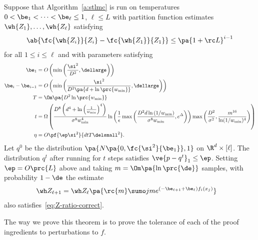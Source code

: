 \begin{lem}\label{lem:a1-correct-perturb}
Suppose that Algorithm~\ref{a:stlmc} is run on temperatures $0<\be_1<\cdots< \be_\ell\le 1$, $\ell\le L$ with partition function estimates $\wh{Z_1},\ldots, \wh{Z_\ell}$ satisfying
\begin{align}\label{eq:Z-ratio-correct}
\ab{\fc{\wh{Z_i}}{Z_i} - \fc{\wh{Z_1}}{Z_1}}\le \pa{1+\rc L}^{i-1}
\end{align} 
for all $1\le i\le \ell$
and with parameters satisfying
\begin{align}
\label{eq:beta1-perturb}
\be_1 &= O\left(\min\left(\frac{\si^2}{D^2}, \dellarge \right)\right)\\
\label{eq:beta-diff-perturb}
\be_i-\be_{i-1} &= 
O \left(\min\left( \frac{\si^2}{D^2\pa{d+\ln \prc{w_{\min}}}} , \dellarge \right)\right)\\
T&=\Om\pa{D^2\ln \prc{w_{\min}}}\\
t&=\Omega \left(\frac{D^8 \left(d^4 + \ln\left(\frac{1}{w_{\min}}\right)^4 \right)}{\sigma^8 w^4_{\min}} \ln\left(\frac{1}{\epsilon} \max\left(\frac{D^2 d \ln\left(1/w_{\min}\right)}{\sigma^8 w_{\min}}, e^{\Delta}\right)\right) \max\left(\frac{D^2}{\sigma^2}, \frac{m^{16}}{\ln(1/w_{\min})^4}\right)\right)\\
\eta &= %
O\pf{\ep \si^2}{dtT \delsmall^2}.
\end{align}
Let $q^0$ be the distribution $\pa{N\pa{0,\fc{\si^2}{\be_1}}, 1}$ on $\R^d\times [\ell]$. 
The distribution $q^t$ after running for $t$ steps satisfies $
\ve{p-q^t}_1\le \ep
$.
Setting $\ep = O\prc{L}$ above and taking $m=\Om\pa{\ln \prc{\de}}$ samples, with probability $1-\de$ the estimate 
\begin{align}\wh Z_{\ell+1}&=
\wh Z_\ell \pa{\rc{m}\sumo jm e^{(-\be_{\ell+1} + \be_\ell)f_i(x_j)}}
\end{align} also satisfies~\eqref{eq:Z-ratio-correct}.
\end{lem}

The way we prove this theorem is to prove the tolerance of each of the proof ingredients to perturbations to $f$.

